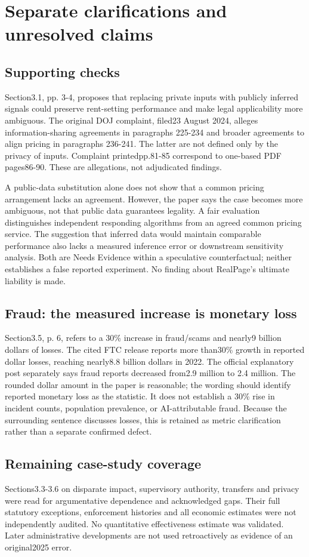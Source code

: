 \documentclass[10pt]{article}
\begin{document}
\section*{Separate clarifications and unresolved claims}
\subsection*{Supporting checks}
Section3.1, pp. 3-4, proposes that replacing private inputs with publicly inferred signals could preserve rent-setting performance and make legal applicability more ambiguous. The original DOJ complaint, filed23 August 2024, alleges information-sharing agreements in paragraphs 225-234 and broader agreements to align pricing in paragraphs 236-241. The latter are not defined only by the privacy of inputs. Complaint printedpp.81-85 correspond to one-based PDF pages86-90. These are allegations, not adjudicated findings.\par
A public-data substitution alone does not show that a common pricing arrangement lacks an agreement. However, the paper says the case becomes more ambiguous, not that public data guarantees legality. A fair evaluation distinguishes independent responding algorithms from an agreed common pricing service. The suggestion that inferred data would maintain comparable performance also lacks a measured inference error or downstream sensitivity analysis. Both are Needs Evidence within a speculative counterfactual; neither establishes a false reported experiment. No finding about RealPage’s ultimate liability is made.\par
\subsection*{Fraud: the measured increase is monetary loss}
Section3.5, p. 6, refers to a 30\% increase in fraud/scams and nearly9 billion dollars of losses. The cited FTC release reports more than30\% growth in reported dollar losses, reaching nearly8.8 billion dollars in 2022. The official explanatory post separately says fraud reports decreased from2.9 million to 2.4 million. The rounded dollar amount in the paper is reasonable; the wording should identify reported monetary loss as the statistic. It does not establish a 30\% rise in incident counts, population prevalence, or AI-attributable fraud. Because the surrounding sentence discusses losses, this is retained as metric clarification rather than a separate confirmed defect.\par
\subsection*{Remaining case-study coverage}
Sections3.3-3.6 on disparate impact, supervisory authority, transfers and privacy were read for argumentative dependence and acknowledged gaps. Their full statutory exceptions, enforcement histories and all economic estimates were not independently audited. No quantitative effectiveness estimate was validated. Later administrative developments are not used retroactively as evidence of an original2025 error.\par
\end{document}
